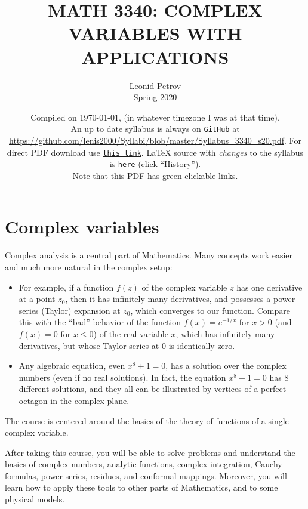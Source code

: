 \documentclass[oneside,11pt]{amsart}
\begin{document}
\title[MATH 3340: COMPLEX VARIABLES WITH APPLICATIONS]{MATH 3340: COMPLEX VARIABLES WITH APPLICATIONS}
\author{Leonid Petrov\\Spring 2020}
\date{Compiled on \today, \currenttime{} (in whatever timezone I was at that time).\\An up to date syllabus is always on \texttt{GitHub} at \url{https://github.com/lenis2000/Syllabi/blob/master/Syllabus_3340_s20.pdf}. For direct PDF download use \href{https://github.com/lenis2000/Syllabi/raw/master/Syllabus_3340_s20.pdf}{\texttt{this link}}.
	\LaTeX{} source with \textit{changes} to the syllabus is \href{https://github.com/lenis2000/Syllabi/blob/master/Syllabus_3340_s20.tex}{\texttt{here}}
(click ``History'').
\\Note that this PDF has green clickable links.}
\maketitle

\section{Complex variables}

Complex analysis is a central part of 
Mathematics. Many concepts work easier and much more natural
in the complex setup:
\begin{itemize}
	\item 
For example, if a function $f(z)$ 
of the complex variable $z$
has one 
derivative at a point $z_0$, then it has infinitely many derivatives,
and possesses a power series (Taylor) expansion at $z_0$, which converges to our function. 
Compare this with the “bad” behavior of the function 
$f(x)=e^{-1/x}$ for $x>0$ (and $f(x)=0$ for $x\le 0$) of the real variable $x$,
which has infinitely many derivatives, but whose Taylor series at $0$ is 
identically zero.
\item Any algebraic equation, even $x^{8}+1=0$,
	has a solution over the complex numbers (even
	if no real solutions). In fact, 
	the equation $x^{8}+1=0$ has $8$ different
	solutions, and they all can be illustrated by vertices of a perfect octagon
	in the complex plane.
\end{itemize}



The course is centered around the basics of the theory of functions of a
single complex variable.

\medskip

After taking this course, you 
will be able to solve problems and understand the 
basics of
complex numbers, analytic functions, 
complex integration, Cauchy formulas, power series, 
residues, and conformal mappings.
Moreover, you will learn how to apply these tools to 
other parts of Mathematics, and to some physical models.
\end{document}
